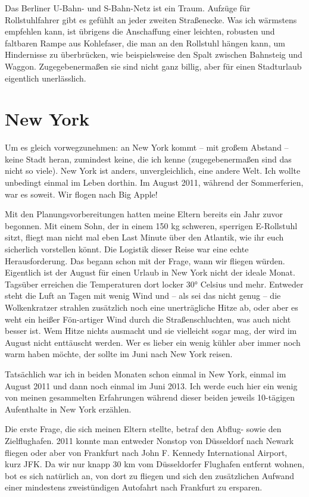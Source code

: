 \documentclass[fontsize=14pt,a4paper,headinclude,DIV=calc,automark]{scrbook}
\begin{document}
Das Berliner U-Bahn- und S-Bahn-Netz ist ein Traum. Aufzüge für Rollstuhlfahrer gibt es gefühlt an jeder zweiten Straßenecke. Was ich wärmstens empfehlen kann, ist übrigens die Anschaffung einer leichten, robusten und faltbaren Rampe aus Kohlefaser, die man an den Rollstuhl hängen kann, um Hindernisse zu überbrücken, wie beispielsweise den Spalt zwischen Bahnsteig und Waggon. Zugegebenermaßen sie sind nicht ganz billig, aber für einen Stadturlaub eigentlich unerlässlich.

\section{New York}

Um es gleich vorwegzunehmen: an New York kommt – mit großem Abstand – keine Stadt heran, zumindest keine, die ich kenne (zugegebenermaßen sind das nicht so viele). New York ist anders, unvergleichlich, eine andere Welt. Ich wollte unbedingt einmal im Leben dorthin. Im August 2011, während der Sommerferien, war es soweit. Wir flogen nach Big Apple!

Mit den Planungsvorbereitungen hatten meine Eltern bereits ein Jahr zuvor begonnen. Mit einem Sohn, der in einem 150 kg schweren, sperrigen E-Rollstuhl sitzt, fliegt man nicht mal eben Last Minute über den Atlantik, wie ihr euch sicherlich vorstellen könnt. Die Logistik dieser Reise war eine echte Herausforderung. Das begann schon mit der Frage, wann wir fliegen würden. Eigentlich ist der August für einen Urlaub in New York nicht der ideale Monat. Tagsüber erreichen die Temperaturen dort locker 30° Celsius und mehr. Entweder steht die Luft an Tagen mit wenig Wind und – als sei das nicht genug – die Wolkenkratzer strahlen zusätzlich noch eine unerträgliche Hitze ab, oder aber es weht ein heißer Fön-artiger Wind durch die Straßenschluchten, was auch nicht besser ist. Wem Hitze nichts ausmacht und sie vielleicht sogar mag, der wird im August nicht enttäuscht werden. Wer es lieber ein wenig kühler aber immer noch warm haben möchte, der sollte im Juni nach New York reisen.

Tatsächlich war ich in beiden Monaten schon einmal in New York, einmal im August 2011 und dann noch einmal im Juni 2013. Ich werde euch hier ein wenig von meinen gesammelten Erfahrungen während dieser beiden jeweils 10-tägigen Aufenthalte in New York erzählen.

Die erste Frage, die sich meinen Eltern stellte, betraf den Abflug- sowie den Zielflughafen. 2011 konnte man entweder Nonstop von Düsseldorf nach Newark fliegen oder aber von Frankfurt nach John F. Kennedy International Airport, kurz JFK. Da wir nur knapp 30 km vom Düsseldorfer Flughafen entfernt wohnen, bot es sich natürlich an, von dort zu fliegen und sich den zusätzlichen Aufwand einer mindestens zweistündigen Autofahrt nach Frankfurt zu ersparen.
\end{document}

